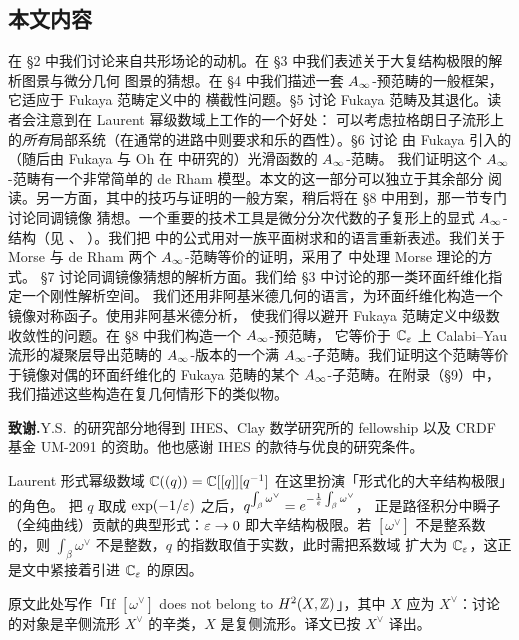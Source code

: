 \subsection{本文内容}

在 \S2 中我们讨论来自共形场论的动机。在 \S3 中我们表述关于大复结构极限的解析图景与微分几何
图景的猜想。在 \S4 中我们描述一套 $A_{\infty}$-预范畴的一般框架，它适应于 Fukaya 范畴定义中的
横截性问题。\S5 讨论 Fukaya 范畴及其退化。读者会注意到在 Laurent 幂级数域上工作的一个好处：
可以考虑拉格朗日子流形上的\emph{所有}局部系统（在通常的进路中则要求和乐的酉性）。\S6 讨论
由 Fukaya 引入的（随后由 Fukaya 与 Oh 在 \cite{FuO} 中研究的）光滑函数的 $A_{\infty}$-范畴。
我们证明这个 $A_{\infty}$-范畴有一个非常简单的 de Rham 模型。本文的这一部分可以独立于其余部分
阅读。另一方面，其中的技巧与证明的一般方案，稍后将在 \S8 中用到，那一节专门讨论同调镜像
猜想。一个重要的技术工具是微分分次代数的子复形上的显式 $A_{\infty}$-结构（见 \cite{GS}、
\cite{Me}）。我们把 \cite{Me} 中的公式用对一族平面树求和的语言重新表述。我们关于 Morse
与 de Rham 两个 $A_{\infty}$-范畴等价的证明，采用了 \cite{HL} 中处理 Morse 理论的方式。
\S7 讨论同调镜像猜想的解析方面。我们给 \S3 中讨论的那一类环面纤维化指定一个刚性解析空间。
我们还用非阿基米德几何的语言，为环面纤维化构造一个镜像对称函子。使用非阿基米德分析，
使我们得以避开 Fukaya 范畴定义中级数收敛性的问题。在 \S8 中我们构造一个 $A_{\infty}$-预范畴，
它等价于 $\mathbb{C}_{\varepsilon}$ 上 Calabi--Yau 流形的凝聚层导出范畴的 $A_{\infty}$-版本的一个满
$A_{\infty}$-子范畴。我们证明这个范畴等价于镜像对偶的环面纤维化的 Fukaya 范畴的某个
$A_{\infty}$-子范畴。在附录（\S9）中，我们描述这些构造在复几何情形下的类似物。

\medskip
\noindent\textbf{致谢.}\quad Y.S.~的研究部分地得到 IHES、Clay 数学研究所的 fellowship 以及
CRDF 基金 UM-2091 的资助。他也感谢 IHES 的款待与优良的研究条件。

\begin{yizhu}[关于 $\C((q))$ 与 $q=\exp(-1/\eps)$]
Laurent 形式幂级数域 $\mathbb{C}((q))=\mathbb{C}[[q]][q^{-1}]$ 在这里扮演「形式化的大辛结构极限」的角色。
把 $q$ 取成 $\exp(-1/\varepsilon)$ 之后，$q^{\int_\beta\omega^{\vee}}=e^{-\frac{1}{\varepsilon}\int_\beta\omega^{\vee}}$，
正是路径积分中瞬子（全纯曲线）贡献的典型形式：$\varepsilon\to0$ 即大辛结构极限。若 $[\omega^{\vee}]$
不是整系数的，则 $\int_\beta\omega^{\vee}$ 不是整数，$q$ 的指数取值于实数，此时需把系数域
扩大为 $\mathbb{C}_{\varepsilon}$，这正是文中紧接着引进 $\mathbb{C}_{\varepsilon}$ 的原因。
\end{yizhu}

\begin{yizhu}[原文的一处笔误]
原文此处写作「If $[\omega^{\vee}]$ does not belong to $H^2(X,\mathbb{Z})$」，其中 $X$ 应为
$X^{\vee}$：讨论的对象是辛侧流形 $X^{\vee}$ 的辛类，$X$ 是复侧流形。译文已按
$X^{\vee}$ 译出。
\end{yizhu}
